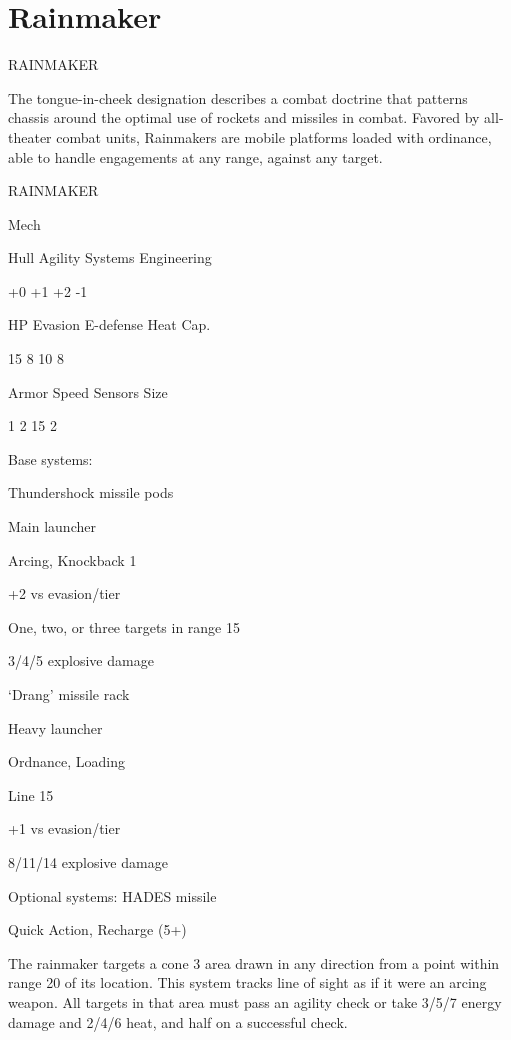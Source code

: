 \section{Rainmaker}

                                             RAINMAKER  

The tongue-in-cheek designation describes a combat doctrine that patterns chassis around the  
optimal use of rockets and missiles in combat. Favored by all-theater combat units, Rainmakers  
are mobile platforms loaded with ordinance, able to handle engagements at any range, against  
any target. 
 

       RAINMAKER 

       Mech 

       Hull       Agility     Systems       Engineering 

       +0         +1          +2            -1 

       HP         Evasion     E-defense     Heat Cap. 

       15         8           10            8 

       Armor      Speed       Sensors       Size 

       1          2           15            2 

Base systems:
 
Thundershock missile pods
 
Main launcher
 
Arcing, Knockback 1
 
+2 vs evasion/tier
 
One, two, or three targets in range 15
 
3/4/5 explosive damage
 

‘Drang’ missile rack
 
Heavy launcher
 
Ordnance, Loading
 
Line 15
 
+1 vs evasion/tier
 
8/11/14 explosive damage
 

Optional systems:  
HADES missile
 
Quick Action, Recharge (5+)
 
The rainmaker targets a cone 3 area drawn in any direction from a point within range 20 of its  
location. This system tracks line of sight as if it were an arcing weapon. All targets in that area  
must pass an agility check or take 3/5/7 energy damage and 2/4/6 heat, and half on a successful  
check.
 

